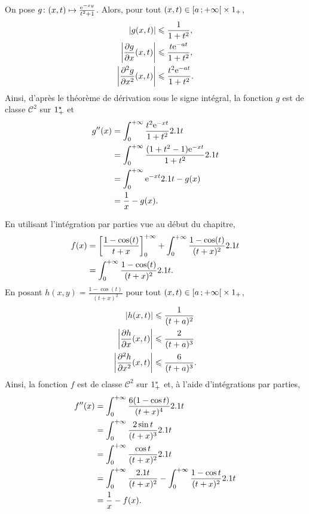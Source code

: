 \begin{solution}
\begin{reponses}
\item On pose $\fonctionligne[g]{(x, t)}{\frac{\e^{-x y}}{t^2 + 1}}$. Alors, pour tout $(x, t) \in \interfo{a}{+\infty} \times \Rp$,
\begin{align*}
\abs{g(x, t)} &\leqslant \frac{1}{1 + t^2},\\
\abs{\frac{\partial g}{\partial x}(x, t)} &\leqslant \frac{t \e^{-a t}}{1 + t^2},\\
\abs{\frac{\partial^2 g}{\partial x^2}(x, t)} &\leqslant \frac{t^2 \e^{-a t}}{1 + t^2}.
\end{align*}
Ainsi, d'après le théorème de dérivation sous le signe intégral, la fonction $g$ est de classe $\mathscr{C}^2$ sur $\Rpe$ et
\begin{align*}
g''(x)
&= \int_0^{+\infty} \frac{t^2 \e^{-x t}}{1 + t^2} \d t\\
&= \int_0^{+\infty} \frac{(1 + t^2 - 1) \e^{-x t}}{1 + t^2} \d t\\
&= \int_0^{+\infty} \e^{-x t} \d t - g(x)\\
&= \frac{1}{x} - g(x).
\end{align*}

\item En utilisant l'intégration par parties vue au début du chapitre,
\begin{align*}
f(x)
&= \left[\frac{1 - \cos(t)}{t + x}\right]_0^{+\infty} + \int_0^{+\infty} \frac{1 - \cos(t)}{(t + x)^2} \d t\\
&= \int_0^{+\infty} \frac{1 - \cos(t)}{(t + x)^2} \d t.
\end{align*}
En posant $h(x, y) = \frac{1 - \cos(t)}{(t + x)^2}$ pour tout $(x, t) \in \interfo{a}{+\infty} \times \Rp$,
\begin{align*}
\abs{h(x, t)} &\leqslant \frac{1}{(t + a)^2}\\
\abs{\frac{\partial h}{\partial x}(x, t)} &\leqslant \frac{2}{(t + a)^3}\\
\abs{\frac{\partial^2 h}{\partial x^2}(x, t)} &\leqslant \frac{6}{(t + a)^3}.
\end{align*}
Ainsi, la fonction $f$ est de classe $\mathscr{C}^2$ sur $\R_+^*$ et, à l'aide d'intégrations par parties,
\begin{align*}
f''(x)
&= \int_0^{+\infty} \frac{6 (1 - \cos t)}{(t + x)^4} \d t\\
&= \int_0^{+\infty} \frac{2 \sin t}{(t + x)^3} \d t\\
&= \int_0^{+\infty} \frac{\cos t}{(t + x)^2} \d t\\
&= \int_0^{+\infty} \frac{\d t}{(t + x)^2} - \int_0^{+\infty} \frac{1 - \cos t}{(t + x)^2} \d t\\
&= \frac{1}{x} - f(x).
\end{align*}


\end{reponses}
\end{solution}
